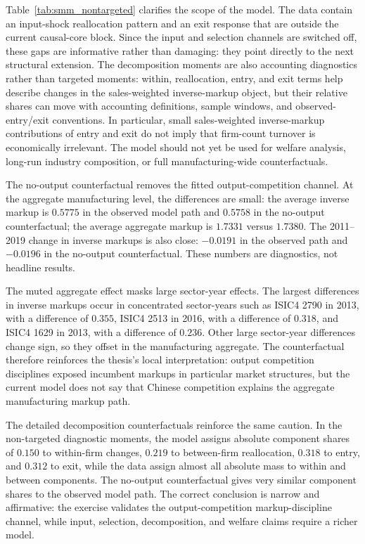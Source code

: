 ﻿\documentclass[12pt]{article}
\begin{document}
Table~\ref{tab:smm_nontargeted} clarifies the scope of the model. The data contain an input-shock reallocation pattern and an exit response that are outside the current causal-core block. Since the input and selection channels are switched off, these gaps are informative rather than damaging: they point directly to the next structural extension. The decomposition moments are also accounting diagnostics rather than targeted moments: within, reallocation, entry, and exit terms help describe changes in the sales-weighted inverse-markup object, but their relative shares can move with accounting definitions, sample windows, and observed-entry/exit conventions. In particular, small sales-weighted inverse-markup contributions of entry and exit do not imply that firm-count turnover is economically irrelevant. The model should not yet be used for welfare analysis, long-run industry composition, or full manufacturing-wide counterfactuals.

The no-output counterfactual removes the fitted output-competition channel. At the aggregate manufacturing level, the differences are small: the average inverse markup is \(0.5775\) in the observed model path and \(0.5758\) in the no-output counterfactual; the average aggregate markup is \(1.7331\) versus \(1.7380\). The 2011--2019 change in inverse markups is also close: \(-0.0191\) in the observed path and \(-0.0196\) in the no-output counterfactual. These numbers are diagnostics, not headline results.

The muted aggregate effect masks large sector-year effects. The largest differences in inverse markups occur in concentrated sector-years such as ISIC4 2790 in 2013, with a difference of \(0.355\), ISIC4 2513 in 2016, with a difference of \(0.318\), and ISIC4 1629 in 2013, with a difference of \(0.236\). Other large sector-year differences change sign, so they offset in the manufacturing aggregate. The counterfactual therefore reinforces the thesis's local interpretation: output competition disciplines exposed incumbent markups in particular market structures, but the current model does not say that Chinese competition explains the aggregate manufacturing markup path.

The detailed decomposition counterfactuals reinforce the same caution. In the non-targeted diagnostic moments, the model assigns absolute component shares of \(0.150\) to within-firm changes, \(0.219\) to between-firm reallocation, \(0.318\) to entry, and \(0.312\) to exit, while the data assign almost all absolute mass to within and between components. The no-output counterfactual gives very similar component shares to the observed model path. The correct conclusion is narrow and affirmative: the exercise validates the output-competition markup-discipline channel, while input, selection, decomposition, and welfare claims require a richer model.
\end{document}
